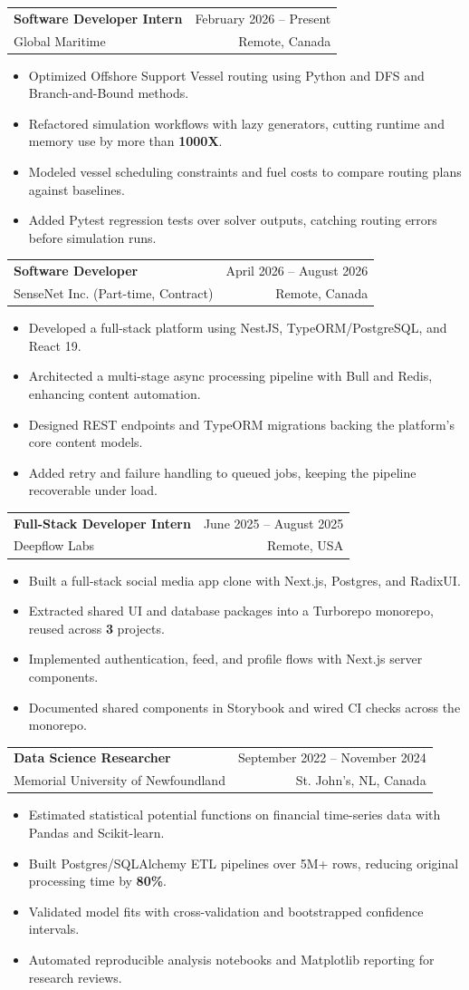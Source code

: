 \documentclass[letterpaper,11pt]{article}
\makeatletter
\newcommand{\resumeItem}[1]{
  \item\small{
    {#1 \vspace{-2pt}}
  }
}
\newcommand{\resumeSubheading}[4]{
  \vspace{-2pt}\item
    \begin{tabular*}{0.97\textwidth}[t]{l@{\extracolsep{\fill}}r}
      \textbf{#1} & {\small #2} \\
      {\small#3} & {\small #4} \\
    \end{tabular*}\vspace{-7pt}
}
\newcommand{\resumeItemListStart}{\begin{itemize}}
\newcommand{\resumeItemListEnd}{\end{itemize}\vspace{-2pt}}
\makeatother
\begin{document}
    \resumeSubheading
      {Software Developer Intern}{February 2026 -- Present}
      {Global Maritime}{Remote, Canada}
      \vspace{0.5pt}
      \resumeItemListStart
        \resumeItem{Optimized Offshore Support Vessel routing using Python and DFS and Branch-and-Bound methods.}
        \resumeItem{Refactored simulation workflows with lazy generators, cutting runtime and memory use by more than \textbf{1000X}.}
        \resumeItem{Modeled vessel scheduling constraints and fuel costs to compare routing plans against baselines.}
        \resumeItem{Added Pytest regression tests over solver outputs, catching routing errors before simulation runs.}
      \resumeItemListEnd

        \resumeSubheading
      {Software Developer}{April 2026 -- August 2026}
      {SenseNet Inc. (Part-time, Contract)}{Remote, Canada}
      \vspace{0.5pt}
      \resumeItemListStart
        \resumeItem{Developed a full-stack platform using NestJS, TypeORM/PostgreSQL, and React 19.}
        \resumeItem{Architected a multi-stage async processing pipeline with Bull and Redis, enhancing content automation.}
        \resumeItem{Designed REST endpoints and TypeORM migrations backing the platform's core content models.}
        \resumeItem{Added retry and failure handling to queued jobs, keeping the pipeline recoverable under load.}
      \resumeItemListEnd

    \resumeSubheading
      {Full-Stack Developer Intern}{June 2025 -- August 2025}
      {Deepflow Labs}{Remote, USA}
      \vspace{0.5pt}
      \resumeItemListStart
        \resumeItem{Built a full-stack social media app clone with Next.js, Postgres, and RadixUI.}
        \resumeItem{Extracted shared UI and database packages into a Turborepo monorepo, reused across \textbf{3} projects.}
        \resumeItem{Implemented authentication, feed, and profile flows with Next.js server components.}
        \resumeItem{Documented shared components in Storybook and wired CI checks across the monorepo.}
      \resumeItemListEnd

    \resumeSubheading
      {Data Science Researcher}{September 2022 -- November 2024}
      {Memorial University of Newfoundland}{St. John's, NL, Canada}
      \vspace{0.5pt}
      \resumeItemListStart
        \resumeItem{Estimated statistical potential functions on financial time-series data with Pandas and Scikit-learn.}
        \resumeItem{Built Postgres/SQLAlchemy ETL pipelines over 5M+ rows, reducing original processing time by \textbf{80\%}.}
        \resumeItem{Validated model fits with cross-validation and bootstrapped confidence intervals.}
        \resumeItem{Automated reproducible analysis notebooks and Matplotlib reporting for research reviews.}
      \resumeItemListEnd
\end{document}
